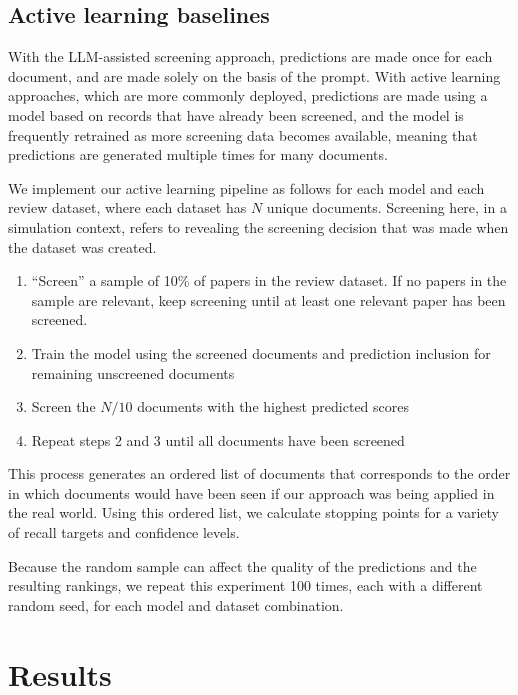 \documentclass{article}
\begin{document}
	\subsection*{Active learning baselines}
	
	With the LLM-assisted screening approach, predictions are made once for each document, and are made solely on the basis of the prompt. With active learning approaches, which are more commonly deployed, predictions are made using a model based on records that have already been screened, and the model is frequently retrained as more screening data becomes available, meaning that predictions are generated multiple times for many documents.
	
	We implement our active learning pipeline as follows for each model and each review dataset, where each dataset has $N$ unique documents. Screening here, in a simulation context, refers to revealing the screening decision that was made when the dataset was created.
	
	\begin{enumerate}
		\item ``Screen'' a sample of 10\% of papers in the review dataset. If no papers in the sample are relevant, keep screening until at least one relevant paper has been screened.
		\item Train the model using the screened documents and prediction inclusion for remaining unscreened documents
		\item Screen the $N/10$ documents with the highest predicted scores 
		\item Repeat steps 2 and 3 until all documents have been screened
	\end{enumerate}

	This process generates an ordered list of documents that corresponds to the order in which documents would have been seen if our approach was being applied in the real world. Using this ordered list, we calculate stopping points for a variety of recall targets and confidence levels.
	
	Because the random sample can affect the quality of the predictions and the resulting rankings, we repeat this experiment 100 times, each with a different random seed, for each model and dataset combination. 
	
	\section*{Results}
	
\end{document}
